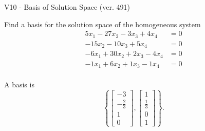 \begin{exercise}
  \begin{exerciseTitle}V10 - Basis of Solution Space (ver. 491)\end{exerciseTitle}
  \begin{exerciseStatement}
    Find a basis for the solution space of the homogeneous system 
\begin{align*}
 5 x_ 1 -27 x_ 2 -3 x_ 3 + 4 x_ 4 &= 0  \\ 
  -15 x_ 2 -10 x_ 3 + 5 x_ 4 &= 0  \\ 
  -6 x_ 1 + 30 x_ 2 + 2 x_ 3 -4 x_ 4 &= 0  \\ 
  -1 x_ 1 + 6 x_ 2 + 1 x_ 3 -1 x_ 4 &= 0  \\ 
 \end{align*}


 
  \end{exerciseStatement}

  \begin{exerciseAnswer}
   A basis is   
\[\left\{\left[\begin{array}{c}
-3 \\
-\frac{2}{3} \\
1 \\
0
\end{array}\right] , \left[\begin{array}{c}
1 \\
\frac{1}{3} \\
0 \\
1
\end{array}\right]\right\}.\]

  


  \end{exerciseAnswer}
\end{exercise}